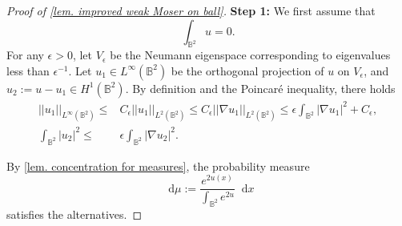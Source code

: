 \documentclass[11pt,a4paper,twoside]{amsart}
\newtheorem{sketch proof}{Sketch of the proof}[section]
\newcommand{\dd}{\mathop{}\!\mathrm{d}}
\begin{document}
    \begin{proof}[Proof of \cref{lem. improved weak Moser on ball}]
    {\bf Step 1:} We first assume that
    \[
    \int_{\mathbb{B}^2}u=0.
    \]
    For any $\epsilon>0$, let $V_\epsilon$ be the Neumann eigenspace corresponding to eigenvalues less than $\epsilon^{-1}$. Let $u_1\in L^{\infty}(\mathbb{B}^2)$ be the orthogonal projection of $u$ on $V_\epsilon$, and $u_2:=u-u_1\in H^1(\mathbb{B}^2)$. By definition and the Poincar\'e inequality, there holds
    \begin{align}
        ||u_1||_{L^{\infty}(\mathbb{B}^2)}
        \leq& C_\epsilon 
        ||u_1||_{L^2(\mathbb{B}^2)}
        \leq C_\epsilon ||\nabla u_1||_{L^2(\mathbb{B}^2)}
        \leq \epsilon\int_{\mathbb{B}^2}
        |\nabla u_1|^2
        +C_\epsilon,\label{eq. upper bound of u1}\\
        \int_{\mathbb{B}^2}|u_2|^2
        \leq& \epsilon 
        \int_{\mathbb{B}^2}|\nabla u_2|^2.
        \label{eq. L2 bound of u2}
    \end{align}

    
        By \cref{lem. concentration for measures}, the probability measure
        \[
        \dd\mu:=\frac{e^{2u(x)}}{\int_{\mathbb{B}^2}e^{2u}}\dd x
        \]
        satisfies the alternatives.


\end{proof}
\end{document}
